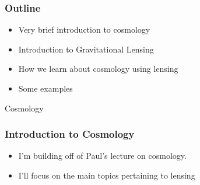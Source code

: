 \documentclass{beamer}
\begin{document}
\frame
{
    \frametitle{Outline}


    \begin{itemize}

        \item Very brief introduction to cosmology
        \item Introduction to Gravitational Lensing
        \item How we learn about cosmology using lensing
        \item Some examples

    \end{itemize}

}

\frame
{

    {\huge Cosmology}

}

\frame
{
    \frametitle{Introduction to Cosmology}


    \begin{itemize}

        \item I'm building off of Paul's lecture on cosmology.

        \item I'll focus on the main topics pertaining to lensing





    \end{itemize}

}
\end{document}
